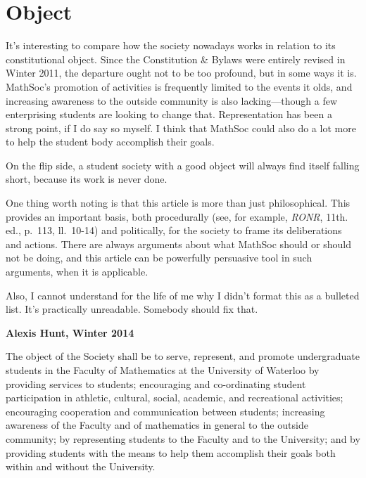\section{Object}
\begin{annotation}
It's interesting to compare how the society nowadays works in relation to its
constitutional object. Since the Constitution \& Bylaws were entirely revised in
Winter 2011, the departure ought not to be too profound, but in some ways it is.
MathSoc's promotion of activities is frequently limited to the events it olds,
and increasing awareness to the outside community is also lacking---though a few
enterprising students are looking to change that. Representation has been a
strong point, if I do say so myself. I think that MathSoc could also do a lot
more to help the student body accomplish their goals.

On the flip side, a student society with a good object will always find itself
falling short, because its work is never done.

One thing worth noting is that this article is more than just philosophical.
This provides an important basis, both procedurally (see, for example,
\emph{RONR}, 11th. ed., p.~113, ll.~10-14) and politically, for the society to
frame its deliberations and actions. There are always arguments about what
MathSoc should or should not be doing, and this article can be powerfully
persuasive tool in such arguments, when it is applicable.

Also, I cannot understand for the life of me why I didn't format this as a
bulleted list. It's practically unreadable. Somebody should fix that.

\textbf{Alexis Hunt, Winter 2014}

\end{annotation}

The object of the Society shall be to serve, represent, and promote
undergraduate students in the Faculty of Mathematics at the University of
Waterloo by providing services to students; encouraging and co-ordinating
student participation in athletic, cultural, social, academic, and recreational
activities; encouraging cooperation and communication between students;
increasing awareness of the Faculty and of mathematics in general to the outside
community; by representing students to the Faculty and to the University; and by
providing students with the means to help them accomplish their goals both
within and without the University.
